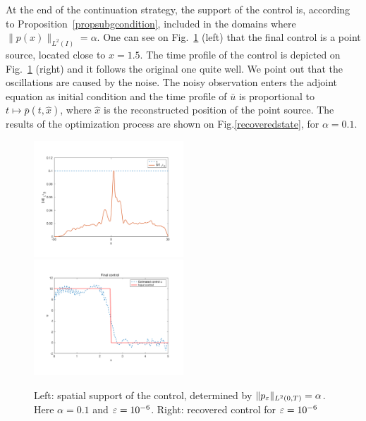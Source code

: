 At the end of the continuation strategy, the support of the control is, according to Proposition~\ref{propsubgcondition}, included in the domains where $\|p(x)\|_{L^2(I)} = \alpha$. One can see on Fig.~\ref{support} (left) that the final control is a point source, located close to $x=1.5$. The time profile of the control is depicted on Fig.~\ref{support} (right) and it follows the original one quite well. We point out that the oscillations are caused by the noise. The noisy observation enters the adjoint equation as initial condition and the time profile of $\bar u$ is proportional to $t\mapsto\bar p(t,\hat x)$, where $\hat x$ is the reconstructed position of the point source. The results  of the optimization process are shown on Fig.\ref{recoveredstate}, for $\alpha = 0.1$.
\begin{figure}[htb]
\includegraphics[width = 0.5\textwidth]{images/normp.pdf}
 \includegraphics[width = 0.5\textwidth]{images/ex1recoveredcontrol2.pdf}
\caption{Left: spatial support of the control, determined by $\lVert p_{\varepsilon}\rVert_{L^2(0,T)} = \alpha$. Here $\alpha = 0.1$ and $\varepsilon = 10^{-6}$. Right: recovered control for $\varepsilon = 10^{-6}$}
\label{support}
\end{figure}
